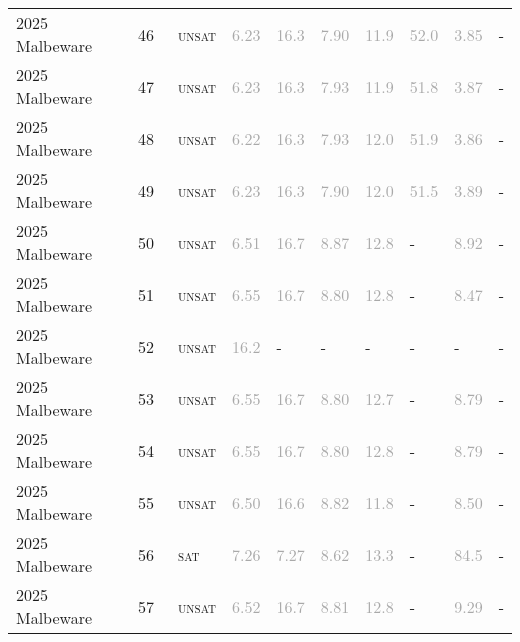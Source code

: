 \begin{center}
{\begin{longtable}{@{}llllllllll@{}}
2025 Malbeware & 46 & ~\textsc{unsat} & \textcolor{darkgray}{6.23} & \textcolor{darkgray}{16.3} & \textcolor{darkgray}{7.90} & \textcolor{darkgray}{11.9} & \textcolor{darkgray}{52.0} & \textcolor{darkgray}{3.85} & - \\
2025 Malbeware & 47 & ~\textsc{unsat} & \textcolor{darkgray}{6.23} & \textcolor{darkgray}{16.3} & \textcolor{darkgray}{7.93} & \textcolor{darkgray}{11.9} & \textcolor{darkgray}{51.8} & \textcolor{darkgray}{3.87} & - \\
2025 Malbeware & 48 & ~\textsc{unsat} & \textcolor{darkgray}{6.22} & \textcolor{darkgray}{16.3} & \textcolor{darkgray}{7.93} & \textcolor{darkgray}{12.0} & \textcolor{darkgray}{51.9} & \textcolor{darkgray}{3.86} & - \\
2025 Malbeware & 49 & ~\textsc{unsat} & \textcolor{darkgray}{6.23} & \textcolor{darkgray}{16.3} & \textcolor{darkgray}{7.90} & \textcolor{darkgray}{12.0} & \textcolor{darkgray}{51.5} & \textcolor{darkgray}{3.89} & - \\
2025 Malbeware & 50 & ~\textsc{unsat} & \textcolor{darkgray}{6.51} & \textcolor{darkgray}{16.7} & \textcolor{darkgray}{8.87} & \textcolor{darkgray}{12.8} & - & \textcolor{darkgray}{8.92} & - \\
2025 Malbeware & 51 & ~\textsc{unsat} & \textcolor{darkgray}{6.55} & \textcolor{darkgray}{16.7} & \textcolor{darkgray}{8.80} & \textcolor{darkgray}{12.8} & - & \textcolor{darkgray}{8.47} & - \\
2025 Malbeware & 52 & ~\textsc{unsat} & \textcolor{darkgray}{16.2} & - & - & - & - & - & - \\
2025 Malbeware & 53 & ~\textsc{unsat} & \textcolor{darkgray}{6.55} & \textcolor{darkgray}{16.7} & \textcolor{darkgray}{8.80} & \textcolor{darkgray}{12.7} & - & \textcolor{darkgray}{8.79} & - \\
2025 Malbeware & 54 & ~\textsc{unsat} & \textcolor{darkgray}{6.55} & \textcolor{darkgray}{16.7} & \textcolor{darkgray}{8.80} & \textcolor{darkgray}{12.8} & - & \textcolor{darkgray}{8.79} & - \\
2025 Malbeware & 55 & ~\textsc{unsat} & \textcolor{darkgray}{6.50} & \textcolor{darkgray}{16.6} & \textcolor{darkgray}{8.82} & \textcolor{darkgray}{11.8} & - & \textcolor{darkgray}{8.50} & - \\
2025 Malbeware & 56 & ~\textsc{sat} & \textcolor{darkgray}{7.26} & \textcolor{darkgray}{7.27} & \textcolor{darkgray}{8.62} & \textcolor{darkgray}{13.3} & - & \textcolor{darkgray}{84.5} & - \\
2025 Malbeware & 57 & ~\textsc{unsat} & \textcolor{darkgray}{6.52} & \textcolor{darkgray}{16.7} & \textcolor{darkgray}{8.81} & \textcolor{darkgray}{12.8} & - & \textcolor{darkgray}{9.29} & - \\

\end{longtable}}
\end{center}
